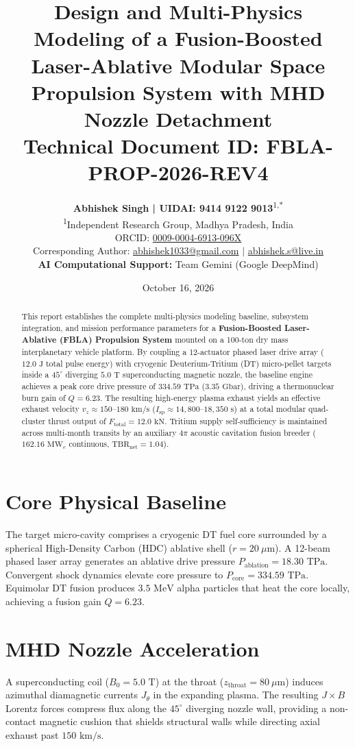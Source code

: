 \documentclass[10pt,3p,twocolumn]{article}
\title{\textbf{\Large Design and Multi-Physics Modeling of a Fusion-Boosted Laser-Ablative Modular Space Propulsion System with MHD Nozzle Detachment}\\[0.3em]
\large Technical Document ID: FBLA-PROP-2026-REV4}
\author{\textbf{Abhishek Singh |  UIDAI: 9414 9122 9013}\textsuperscript{1,*}\\
\small \textsuperscript{1}Independent Research Group, Madhya Pradesh, India\\
\small ORCID: \href{https://orcid.org/0009-0004-6913-096X}{0009-0004-6913-096X}\\
\small *Corresponding Author: \href{mailto:abhishek1033@gmail.com}{abhishek1033@gmail.com} $|$ \href{mailto:abhishek.s@live.in}{abhishek.s@live.in}\\[0.5em]
\small \textbf{AI Computational Support:} Team Gemini (Google DeepMind)
}
\date{October 16, 2026}
\begin{document}
\maketitle

\begin{abstract}
\noindent This report establishes the complete multi-physics modeling baseline, subsystem integration, and mission performance parameters for a \textbf{Fusion-Boosted Laser-Ablative (FBLA) Propulsion System} mounted on a 100-ton dry mass interplanetary vehicle platform. By coupling a 12-actuator phased laser drive array ($12.0\text{ J}$ total pulse energy) with cryogenic Deuterium-Tritium (DT) micro-pellet targets inside a $45^\circ$ diverging $5.0\text{ T}$ superconducting magnetic nozzle, the baseline engine achieves a peak core drive pressure of $334.59\text{ TPa}$ ($3.35\text{ Gbar}$), driving a thermonuclear burn gain of $Q = 6.23$. The resulting high-energy plasma exhaust yields an effective exhaust velocity $v_z \approx 150\text{--}180\text{ km/s}$ ($I_{\text{sp}} \approx 14,800\text{--}18,350\text{ s}$) at a total modular quad-cluster thrust output of $F_{\text{total}} = 12.0\text{ kN}$. Tritium supply self-sufficiency is maintained across multi-month transits by an auxiliary $4\pi$ acoustic cavitation fusion breeder ($162.16\text{ MW}_e$ continuous, $\text{TBR}_{\text{net}} = 1.04$).
\end{abstract}

\section{Core Physical Baseline}
The target micro-cavity comprises a cryogenic DT fuel core surrounded by a spherical High-Density Carbon (HDC) ablative shell ($r = 20\ \mu\text{m}$). A 12-beam phased laser array generates an ablative drive pressure $P_{\text{ablation}} = 18.30\text{ TPa}$. Convergent shock dynamics elevate core pressure to $P_{\text{core}} = 334.59\text{ TPa}$. Equimolar DT fusion produces $3.5\text{ MeV}$ alpha particles that heat the core locally, achieving a fusion gain $Q = 6.23$.

\section{MHD Nozzle Acceleration}
A superconducting coil ($B_0 = 5.0\text{ T}$) at the throat ($z_{\text{throat}} = 80\ \mu\text{m}$) induces azimuthal diamagnetic currents $J_\theta$ in the expanding plasma. The resulting $J \times B$ Lorentz forces compress flux along the $45^\circ$ diverging nozzle wall, providing a non-contact magnetic cushion that shields structural walls while directing axial exhaust past $150\text{ km/s}$.
\end{document}
